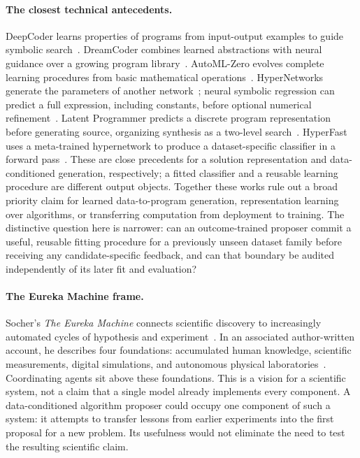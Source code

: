 \paragraph{The closest technical antecedents.}
DeepCoder learns properties of programs from input-output examples to guide
symbolic search~\cite{deepcoder}. DreamCoder combines learned abstractions with
neural guidance over a growing program library~\cite{dreamcoder}.
AutoML-Zero evolves complete learning procedures from basic mathematical
operations~\cite{automlzero}. HyperNetworks generate the parameters of another
network~\cite{hypernetworks}; neural symbolic regression can predict a full
expression, including constants, before optional numerical
refinement~\cite{symbolicregression}. Latent Programmer predicts a discrete
program representation before generating source, organizing synthesis as a
two-level search~\cite{latentprogrammer}. HyperFast uses a meta-trained
hypernetwork to produce a dataset-specific classifier in a forward
pass~\cite{hyperfast}. These are close precedents for a solution representation
and data-conditioned generation, respectively; a fitted classifier and a
reusable learning procedure are different output objects. Together these works rule out a broad
priority claim for learned data-to-program generation, representation
learning over algorithms, or transferring computation from deployment to
training. The distinctive question here is narrower: can an outcome-trained
proposer commit a useful, reusable fitting procedure for a previously unseen
dataset family before receiving any candidate-specific feedback, and can that
boundary be audited independently of its later fit and evaluation?

\paragraph{The Eureka Machine frame.}
Socher's \emph{The Eureka Machine} connects scientific discovery to increasingly
automated cycles of hypothesis and experiment~\cite{socher}. In an
associated author-written account, he describes four foundations: accumulated
human knowledge, scientific measurements, digital simulations, and autonomous
physical laboratories~\cite{socherpillars}. Coordinating agents sit above these
foundations. This is a vision for a scientific system, not a claim that a
single model already implements every component. A data-conditioned algorithm
proposer could occupy one component of such a system: it attempts to transfer
lessons from earlier experiments into the first proposal for a new problem.
Its usefulness would not eliminate the need to test the resulting scientific
claim.

